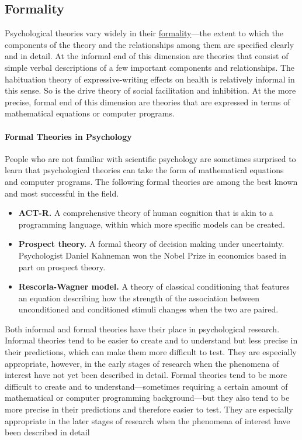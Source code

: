\documentclass[
]{krantz}
\providecommand{\tightlist}{%
  \setlength{\itemsep}{0pt}\setlength{\parskip}{0pt}}
\begin{document}
\subsection*{Formality}\label{formality}


Psychological theories vary widely in their \hyperref[formality]{formality}---the extent to which the components of the theory and the relationships among them are specified clearly and in detail. At the informal end of this dimension are theories that consist of simple verbal descriptions of a few important components and relationships. The habituation theory of expressive-writing effects on health is relatively informal in this sense. So is the drive theory of social facilitation and inhibition. At the more precise, formal end of this dimension are theories that are expressed in terms of mathematical equations or computer programs.

\paragraph*{Formal Theories in Psychology}\label{formal-theories-in-psychology}

People who are not familiar with scientific psychology are sometimes surprised to learn that psychological theories can take the form of mathematical equations and computer programs. The following formal theories are among the best known and most successful in the field.

\begin{itemize}
\tightlist
\item
  \textbf{ACT-R.} A comprehensive theory of human cognition that is akin to a programming language, within which more specific models can be created.
\item
  \textbf{Prospect theory.} A formal theory of decision making under uncertainty. Psychologist Daniel Kahneman won the Nobel Prize in economics based in part on prospect theory.
\item
  \textbf{Rescorla-Wagner model.} A theory of classical conditioning that features an equation describing how the strength of the association between unconditioned and conditioned stimuli changes when the two are paired.
\end{itemize}

Both informal and formal theories have their place in psychological research. Informal theories tend to be easier to create and to understand but less precise in their predictions, which can make them more difficult to test. They are especially appropriate, however, in the early stages of research when the phenomena of interest have not yet been described in detail. Formal theories tend to be more difficult to create and to understand---sometimes requiring a certain amount of mathematical or computer programming background---but they also tend to be more precise in their predictions and therefore easier to test. They are especially appropriate in the later stages of research when the phenomena of interest have been described in detail
\end{document}

